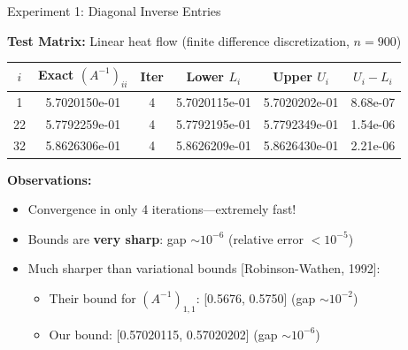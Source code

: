 \documentclass[aspectratio=169, 12pt]{beamer}
\begin{document}
\begin{frame}{Experiment 1: Diagonal Inverse Entries}

\textbf{Test Matrix:} Linear heat flow (finite difference discretization, \(n = 900\))

\vspace{0.2cm}

\begin{center}
\begin{tabular}{|c|c|c|c|c|c|}
\hline
\(i\) & Exact \((A^{-1})_{ii}\) & Iter & Lower \(L_i\) & Upper \(U_i\) & \(U_i - L_i\) \\
\hline
1 & 5.7020150e-01 & 4 & 5.7020115e-01 & 5.7020202e-01 & 8.68e-07 \\
22 & 5.7792259e-01 & 4 & 5.7792195e-01 & 5.7792349e-01 & 1.54e-06 \\
32 & 5.8626306e-01 & 4 & 5.8626209e-01 & 5.8626430e-01 & 2.21e-06 \\
\hline
\end{tabular}
\end{center}

\vspace{0.3cm}

\textbf{Observations:}
\begin{itemize}
    \item Convergence in only \alert{4 iterations}---extremely fast!
    \item Bounds are \textbf{very sharp}: gap \(\sim 10^{-6}\) (relative error \(<10^{-5}\))
    \item Much sharper than variational bounds [Robinson-Wathen, 1992]:
    \begin{itemize}
        \item Their bound for \((A^{-1})_{1,1}\): [0.5676, 0.5750] (gap \(\sim 10^{-2}\))
        \item Our bound: [0.57020115, 0.57020202] (gap \(\sim 10^{-6}\))
    \end{itemize}
\end{itemize}

\end{frame}
\end{document}
